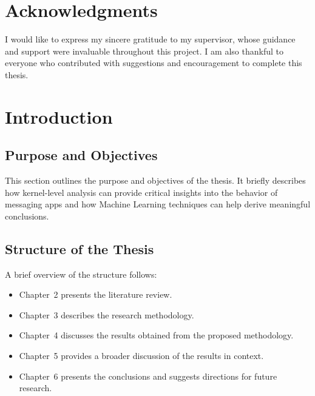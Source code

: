 \documentclass[a4paper,12pt]{report}
\begin{document}
\chapter*{Acknowledgments}

I would like to express my sincere gratitude to my supervisor, whose guidance and support were invaluable throughout this project. I am also thankful to everyone who contributed with suggestions and encouragement to complete this thesis.

\clearpage

\tableofcontents
\clearpage

\chapter{Introduction}

\section{Purpose and Objectives}
This section outlines the purpose and objectives of the thesis. It briefly describes how kernel-level analysis can provide critical insights into the behavior of messaging apps and how Machine Learning techniques can help derive meaningful conclusions.

\section{Structure of the Thesis}
A brief overview of the structure follows:
\begin{itemize}
    \item Chapter~2 presents the literature review.
    \item Chapter~3 describes the research methodology.
    \item Chapter~4 discusses the results obtained from the proposed methodology.
    \item Chapter~5 provides a broader discussion of the results in context.
    \item Chapter~6 presents the conclusions and suggests directions for future research.
\end{itemize}
\end{document}
